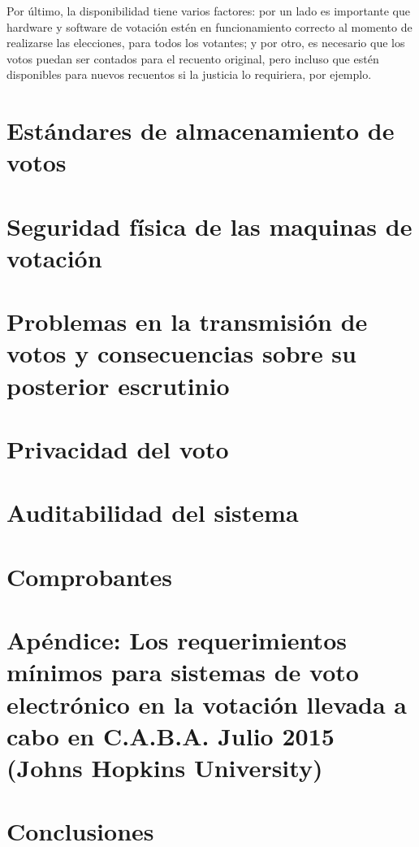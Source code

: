 \documentclass[a4,11pt]{article}
\begin{document}
Por último, la disponibilidad tiene varios factores: por un lado es importante que hardware y software de votación estén en funcionamiento correcto al momento de realizarse las elecciones, para todos los votantes; y por otro, es necesario que los votos puedan ser contados para el recuento original, pero incluso que estén disponibles para nuevos recuentos si la justicia lo requiriera, por ejemplo.

\pagebreak
\section{Estándares de almacenamiento de votos}


\pagebreak
\section{Seguridad física de las maquinas de votación}


\pagebreak
\section{Problemas en la transmisión de votos y consecuencias sobre su posterior escrutinio}


\pagebreak
\section{Privacidad del voto}



\pagebreak
\section{Auditabilidad del sistema}


\pagebreak
\section{Comprobantes}


\pagebreak
\section{Apéndice: Los requerimientos mínimos para sistemas de voto electrónico en la votación llevada a cabo en C.A.B.A. Julio 2015 (Johns Hopkins University)}


\pagebreak
\section{Conclusiones}


\end{document}
